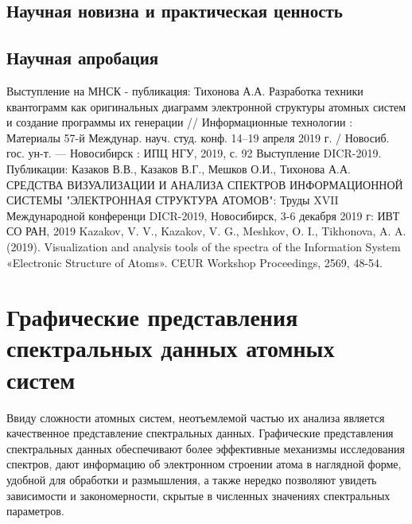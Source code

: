 \documentclass[a4paper, 12pt]{article}
\let\stdsection\section
\renewcommand\section{\newpage\stdsection}
\begin{document}
    \subsection*{Научная новизна и практическая ценность}
    
    \subsection*{Научная апробация}
    Выступление на МНСК - публикация: Тихонова А.А. Разработка техники квантограмм как оригинальных диаграмм электронной
структуры атомных систем и создание программы их генерации // Информационные
технологии : Материалы 57-й Междунар. науч. студ. конф. 14–19 апреля 2019 г. / Новосиб. гос. ун-т. — Новосибирск : ИПЦ НГУ, 2019, с. 92
Выступление DICR-2019. Публикации: Казаков В.В., Казаков В.Г., Мешков О.И., Тихонова А.А. СРЕДСТВА ВИЗУАЛИЗАЦИИ И АНАЛИЗА СПЕКТРОВ ИНФОРМАЦИОННОЙ СИСТЕМЫ "ЭЛЕКТРОННАЯ СТРУКТУРА АТОМОВ": Труды XVII Международной конференци DICR-2019, Новосибирск, 3-6 декабря 2019 г: ИВТ СО РАН, 2019
Kazakov, V. V., Kazakov, V. G., Meshkov, O. I., Tikhonova, A. A. (2019). Visualization and analysis tools of the spectra of the Information System «Electronic Structure of Atoms». CEUR Workshop Proceedings, 2569, 48-54.
    

\section{Графические представления спектральных данных атомных систем}
 Ввиду сложности атомных систем, неотъемлемой частью их анализа является качественное представление спектральных данных. Графические представления спектральных данных обеспечивают более эффективные механизмы исследования спектров, дают информацию об электронном строении атома в наглядной форме, удобной для обработки и размышления, а также нередко позволяют увидеть зависимости и закономерности, скрытые в численных значениях спектральных параметров.
\end{document}
